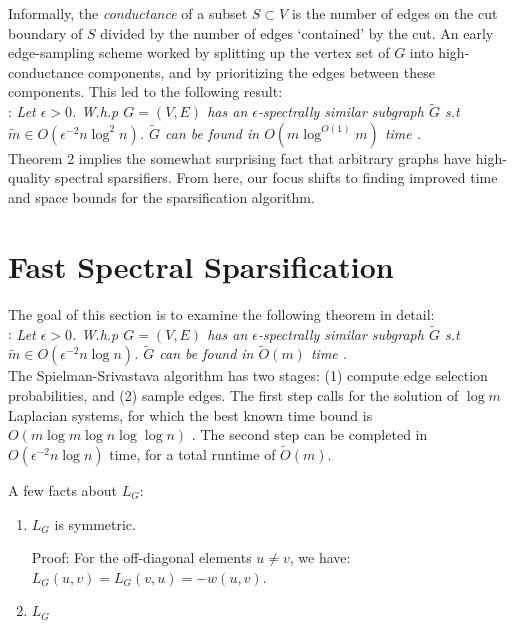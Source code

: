 \documentclass{article}
\begin{document}
Informally, the \textit{conductance} of a subset $S \subset V$ is the number
of edges on the cut boundary of $S$ divided by the number of edges
`contained' by the cut.  An early edge-sampling scheme worked by splitting
up the vertex set of $G$ into high-conductance components, and by
prioritizing the edges between these components. This led to the following
result: \\

\noindent
{}: \textit{Let $\epsilon > 0$. W.h.p $G =
(V, E)$ has an $\epsilon$-spectrally similar subgraph $\tilde{G}$ s.t
$\tilde{m} \in O(\epsilon^{-2}n\log^2 n)$. $\tilde{G}$ can be found in
$O(m\log^{O(1)}m)$ time \cite{SpielmanTeng} \cite{TheSurvey}.} \\

Theorem 2 implies the somewhat surprising fact that arbitrary graphs have
high-quality spectral sparsifiers. From here, our focus shifts to finding
improved time and space bounds for the sparsification algorithm.

\section{Fast Spectral Sparsification}

The goal of this section is to examine the following theorem in detail: \\

\noindent
{}: \textit{Let $\epsilon > 0$.
W.h.p $G = (V, E)$ has an $\epsilon$-spectrally similar subgraph $\tilde{G}$
s.t $\tilde{m} \in O(\epsilon^{-2}n\log n)$. $\tilde{G}$ can be found in
$\tilde{O}(m)$ time \cite{SpielmanSrivastava} \cite{TheSurvey}.} \\

The Spielman-Srivastava algorithm has two stages: (1) compute edge selection
probabilities, and (2) sample edges. The first step calls for the solution
of $\log m$ Laplacian systems, for which the best known time bound is $O(m
\log m \log n \log\log n)$ \cite{FastLaplacianSolver} \cite{TheSurvey}. The
second step can be completed in $O(\epsilon^{-2}n\log n)$ time, for a total
runtime of $\tilde{O}(m)$.

A few facts about $L_G$:
\begin{enumerate}[1.]
    \item $L_G$ is symmetric.

        Proof: For the off-diagonal elements $u \not= v$, we have: $L_G(u,
        v) = L_G(v, u) = -w(u, v)$.

    \item $L_G$ 
\end{enumerate}
\end{document}
